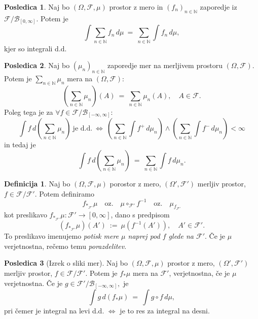 \documentclass[11pt]{article}
\newcommand{\N}{\mathbb{N}}
\newcommand{\F}{\mathcal{F}}
\newcommand{\B}{\mathscr{B}}
\newcommand{\oklepaj}[1]{\left(#1\right)}
\newcommand{\1}{\mathbbm{1}}
\newcommand{\rr}{[-\infty,\infty]}
\theoremstyle{definition}
\newtheorem{definicija}{Definicija}[section]
\theoremstyle{definition}
\theoremstyle{definition}
\theoremstyle{definition}
\newtheorem*{posledica}{Posledica}
\begin{document}
\begin{posledica}

Naj bo $(\Omega, \F, \mu)$ prostor z mero in $(f_n)_{n \in \N}$ zaporedje iz $\F/\B_{[0,\infty]}$. Potem je
$$\int \sum_{n \in \N} f_n \,d\mu ~=~ \sum_{n \in \N} \int f_n \,d\mu,$$
kjer so integrali d.d.

\end{posledica}
\vspace{0.5cm}

\begin{posledica}

Naj bo $(\mu_n)_{n \in \N}$ zaporedje mer na merljivem prostoru $(\Omega, \F)$. Potem je $\sum_{n \in \N} \mu_n$ mera na $(\Omega, \F):$
$$\oklepaj{\sum_{n \in \N} \mu_n}(A) ~=~ \sum_{n \in \N} \mu_n(A), \quad A \in \F.$$
Poleg tega je za $\forall f \in \F/\B_{\rr}$:
$$\int f \,d(\sum_{n \in \N} \mu_n) ~\text{je d.d.} ~\iff~ \oklepaj{\sum_{n \in \N} \int f^+ \,d\mu_n} \wedge \oklepaj{\sum_{n \in \N} \int f^- \,d\mu_n} < \infty$$
in tedaj je
$$\int f \,d(\sum_{n \in \N} \mu_n) ~=~ \sum_{n \in \N} \int f \,d\mu_n.$$

\end{posledica}
\vspace{0.5cm}

\begin{definicija}

Naj bo $(\Omega, \F, \mu)$ porostor z mero, $(\Omega', \F')$ merljiv prostor, $f \in \F/\F'$. Potem definiramo
$$f_{*_{\F'}} \mu \quad \text{oz.} \quad \mu \circ_{\F'} f^{-1} \quad \text{oz.} \quad \mu_{f_{\F'}}$$
kot preslikavo $f_{*_{\F'}} \mu: \F' \rightarrow [0,\infty]$, dano s predpisom
$$(f_{*_{\F'}} \mu)(A') ~:=~ \mu(f^{-1}(A')), \quad A' \in \F'.$$
To preslikavo imenujemo \textit{potisk mere $\mu$ naprej pod $f$ glede na $\F'$}. Če je $\mu$ verjetnostna, rečemo temu \textit{porazdelitev}.

\end{definicija}
\vspace{0.5cm}

\begin{posledica}[Izrek o sliki mer]

Naj bo $(\Omega, \F, \mu)$ prostor z mero, $(\Omega', \F')$ merljiv prostor, $f \in \F/\F'$. Potem je $f_* \mu$ mera na $\F'$, verjetnostna, če je $\mu$ verjetnostna. Če je $g \in \F'/\B_{\rr},$ je
$$\int g \,d(f_*\mu) ~=~ \int g \circ f \,d\mu,$$
pri čemer je integral na levi d.d. $\iff$ je to res za integral na desni.

\end{posledica}
\vspace{0.5cm}
\end{document}
